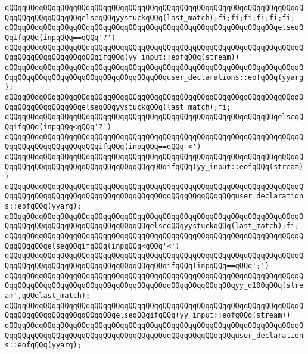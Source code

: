 \verb|qQQqqQQqqQQqqQQqqQQqqQQqqQQqqQQqqQQqqQQqqQQqqQQqqQQqqQQqqQQqqQQqqQQqqQQqqQQqqQQqqQQqqQQqelseqQQqyystuckqQQq(last_match);fi;fi;fi;fi;fi;fi;|\newline
\verb|qQQqqQQqqQQqqQQqqQQqqQQqqQQqqQQqqQQqqQQqqQQqqQQqqQQqqQQqqQQqqQQqelseqQQqifqQQq(inpqQQq==qQQq'?')|\newline
\verb|qQQqqQQqqQQqqQQqqQQqqQQqqQQqqQQqqQQqqQQqqQQqqQQqqQQqqQQqqQQqqQQqqQQqqQQqqQQqqQQqqQQqqQQqqQQqifqQQq(yy_input::eofqQQq(stream))|\newline
\verb|qQQqqQQqqQQqqQQqqQQqqQQqqQQqqQQqqQQqqQQqqQQqqQQqqQQqqQQqqQQqqQQqqQQqqQQqqQQqqQQqqQQqqQQqqQQqqQQqqQQqqQQqqQQquser_declarations::eofqQQq(yyarg);|\newline
\verb|qQQqqQQqqQQqqQQqqQQqqQQqqQQqqQQqqQQqqQQqqQQqqQQqqQQqqQQqqQQqqQQqqQQqqQQqqQQqqQQqqQQqqQQqelseqQQqyystuckqQQq(last_match);fi;|\newline
\verb|qQQqqQQqqQQqqQQqqQQqqQQqqQQqqQQqqQQqqQQqqQQqqQQqqQQqqQQqqQQqqQQqelseqQQqifqQQq(inpqQQq<qQQq'?')|\newline
\verb|qQQqqQQqqQQqqQQqqQQqqQQqqQQqqQQqqQQqqQQqqQQqqQQqqQQqqQQqqQQqqQQqqQQqqQQqqQQqqQQqqQQqqQQqqQQqifqQQq(inpqQQq==qQQq'<')|\newline
\verb|qQQqqQQqqQQqqQQqqQQqqQQqqQQqqQQqqQQqqQQqqQQqqQQqqQQqqQQqqQQqqQQqqQQqqQQqqQQqqQQqqQQqqQQqqQQqqQQqqQQqqQQqqQQqifqQQq(yy_input::eofqQQq(stream))|\newline
\verb|qQQqqQQqqQQqqQQqqQQqqQQqqQQqqQQqqQQqqQQqqQQqqQQqqQQqqQQqqQQqqQQqqQQqqQQqqQQqqQQqqQQqqQQqqQQqqQQqqQQqqQQqqQQqqQQqqQQqqQQqqQQquser_declarations::eofqQQq(yyarg);|\newline
\verb|qQQqqQQqqQQqqQQqqQQqqQQqqQQqqQQqqQQqqQQqqQQqqQQqqQQqqQQqqQQqqQQqqQQqqQQqqQQqqQQqqQQqqQQqqQQqqQQqqQQqqQQqelseqQQqyystuckqQQq(last_match);fi;|\newline
\verb|qQQqqQQqqQQqqQQqqQQqqQQqqQQqqQQqqQQqqQQqqQQqqQQqqQQqqQQqqQQqqQQqqQQqqQQqqQQqqQQqelseqQQqifqQQq(inpqQQq<qQQq'<')|\newline
\verb|qQQqqQQqqQQqqQQqqQQqqQQqqQQqqQQqqQQqqQQqqQQqqQQqqQQqqQQqqQQqqQQqqQQqqQQqqQQqqQQqqQQqqQQqqQQqqQQqqQQqqQQqqQQqifqQQq(inpqQQq==qQQq';')|\newline
\verb|qQQqqQQqqQQqqQQqqQQqqQQqqQQqqQQqqQQqqQQqqQQqqQQqqQQqqQQqqQQqqQQqqQQqqQQqqQQqqQQqqQQqqQQqqQQqqQQqqQQqqQQqqQQqqQQqqQQqqQQqqQQqyy_q100qQQq(stream',qQQqlast_match);|\newline
\verb|qQQqqQQqqQQqqQQqqQQqqQQqqQQqqQQqqQQqqQQqqQQqqQQqqQQqqQQqqQQqqQQqqQQqqQQqqQQqqQQqqQQqqQQqqQQqqQQqelseqQQqifqQQq(yy_input::eofqQQq(stream))|\newline
\verb|qQQqqQQqqQQqqQQqqQQqqQQqqQQqqQQqqQQqqQQqqQQqqQQqqQQqqQQqqQQqqQQqqQQqqQQqqQQqqQQqqQQqqQQqqQQqqQQqqQQqqQQqqQQqqQQqqQQqqQQqqQQquser_declarations::eofqQQq(yyarg);|\newline
